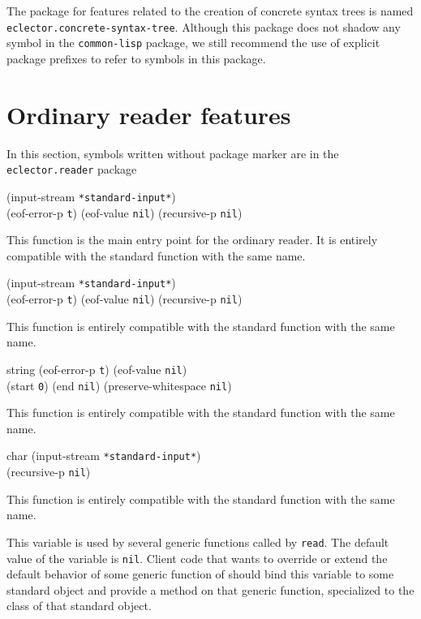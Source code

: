 The package for features related to the creation of concrete syntax
trees is named \texttt{eclector.concrete-syntax-tree}.  Although this
package does not shadow any symbol in the \texttt{common-lisp}
package, we still recommend the use of explicit package prefixes to
refer to symbols in this package.

\section{Ordinary reader features}

In this section, symbols written without package marker are in the
\texttt{eclector.reader} package

 {\optional (input-stream \texttt{*standard-input*})\\
  (eof-error-p \texttt{t})
  (eof-value \texttt{nil})
  (recursive-p \texttt{nil})}

This function is the main entry point for the ordinary reader.  It is
entirely compatible with the standard \commonlisp{} function with the
same name.

 {\optional (input-stream \texttt{*standard-input*})\\
  (eof-error-p \texttt{t})
  (eof-value \texttt{nil})
  (recursive-p \texttt{nil})}

This function is entirely compatible with the standard \commonlisp{}
function with the same name.

 {string \optional
  (eof-error-p \texttt{t})
  (eof-value \texttt{nil})\\
  \key
  (start \texttt{0})
  (end \texttt{nil})
  (preserve-whitespace \texttt{nil})}

This function is entirely compatible with the standard \commonlisp{}
function with the same name.

 {char \optional (input-stream
  \texttt{*standard-input*})\\
  (recursive-p \texttt{nil})}

This function is entirely compatible with the standard \commonlisp{}
function with the same name.


This variable is used by several generic functions called by
\texttt{read}.  The default value of the variable is \texttt{nil}.
Client code that wants to override or extend the default behavior of
some generic function of \sysname{} should bind this variable to some
standard object and provide a method on that generic function,
specialized to the class of that standard object.

